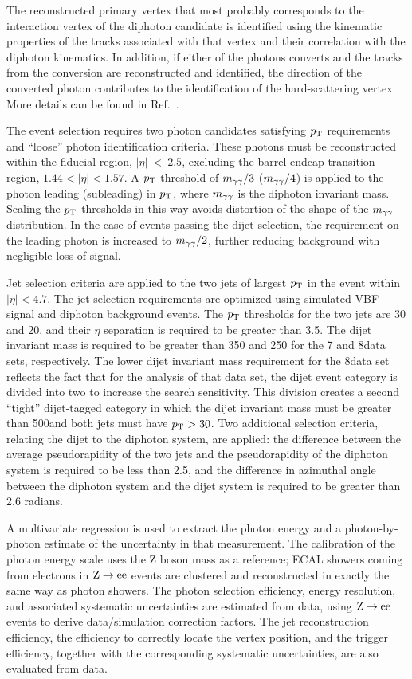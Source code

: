 \documentclass[11pt,twoside,a4paper,cmspaper,final]{cms-tdr}
\begin{document}
The reconstructed primary vertex that most probably corresponds
to the interaction vertex of the diphoton candidate
is identified using the kinematic properties
of the tracks associated with that vertex and their correlation with
the diphoton kinematics.
In addition, if either of the photons converts and the tracks from the conversion are
reconstructed and identified, the direction of the converted photon
contributes to the identification of the hard-scattering vertex.
More details can be found in Ref.~\cite{Chatrchyan:2012tw}.

The event selection requires two photon candidates satisfying
$p_{\mathrm{T}}$ requirements and ``loose'' photon identification criteria.
These photons must be reconstructed
within the fiducial region, $|\eta|~<~2.5$, excluding the
barrel-endcap transition region, $1.44 < |\eta| < 1.57$.
A $p_{\mathrm{T}}$ threshold of $m_{\gamma\gamma}/3$ ($m_{\gamma\gamma}/4$) is applied to
the photon leading (subleading) in $p_{\mathrm{T}}$, where $m_{\gamma\gamma}$ is the
diphoton invariant mass.
Scaling the $p_{\mathrm{T}}$ thresholds in this way avoids distortion of the
shape of the $m_{\gamma\gamma}$ distribution.
In the case of events passing the dijet selection, the requirement
on the leading photon is increased to $m_{\gamma\gamma}/2$,
further reducing background with negligible loss of signal.

Jet selection criteria are applied to the two
jets of largest $p_{\mathrm{T}}$ in the event within $|\eta|< 4.7$.
The jet selection requirements are optimized
using simulated VBF signal and diphoton background events.
The $p_{\mathrm{T}}$ thresholds for the two jets are 30 and 20\GeV, and their $\eta$
separation is required to be greater than 3.5.
The dijet invariant mass is required to be greater than 350 and 250\GeV
for the 7 and 8\TeV data sets, respectively.
The lower dijet invariant mass requirement for the 8\TeV data set
reflects the fact that
for the analysis of that data set, the dijet event category is
divided into two to increase the search sensitivity.
This division creates a second
``tight'' dijet-tagged category in which the dijet invariant
mass must be
greater than 500\GeV and both jets must have
$p_{\mathrm{T}}> 30$\GeV.
Two additional selection criteria, relating the dijet to the diphoton
system, are applied: the difference
between the average pseudorapidity of the two jets and the pseudorapidity
of the diphoton system is required to be less than 2.5,
and the difference in azimuthal angle between the diphoton system
and the dijet system is required to be greater than 2.6 radians.

A multivariate regression is used to extract the photon energy
and a photon-by-photon estimate of the
uncertainty in that measurement.
The calibration of the photon energy scale uses the Z boson mass as a
reference;
ECAL showers coming from electrons in $\mathrm{Z}\to\mathrm{e}\mathrm{e}$ events are
clustered and reconstructed in exactly the same way as photon showers.
The photon selection efficiency, energy resolution, and associated
systematic uncertainties are estimated from data,
using $\mathrm{Z}\to\mathrm{e}\mathrm{e}$ events to derive data/simulation correction factors.
The jet reconstruction efficiency, the efficiency to correctly locate
the vertex position, and the trigger
efficiency, together with the corresponding systematic
uncertainties, are also evaluated from data.
\end{document}
